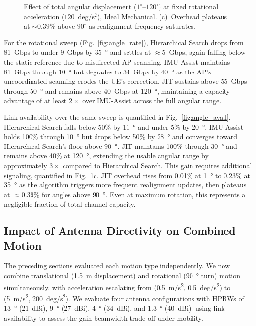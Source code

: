 \documentclass[fleqn,10pt]{wlscirep}
\begin{document}
\begin{figure}[ht!]
    \caption{Effect of total angular displacement ($1^\circ$--$120^\circ$) at fixed rotational acceleration ($120$~deg/s$^2$), Ideal Mechanical. (c)~Overhead plateaus at ${\sim}0.39\%$ above $90^\circ$ as realignment frequency saturates.}
    \label{fig:angle_effects}
    \vspace{-5pt}
\end{figure}

For the rotational sweep (Fig.~\ref{fig:angle_rate}), Hierarchical Search drops from \SI{81}{Gbps} to under \SI{9}{Gbps} by \SI{35}{\degree} and settles at $\approx$\SI{5}{Gbps}, again falling below the static reference due to misdirected AP scanning. IMU-Assist maintains \SI{81}{Gbps} through \SI{10}{\degree} but degrades to \SI{34}{Gbps} by \SI{40}{\degree} as the AP's uncoordinated scanning erodes the UE's correction. JIT sustains above \SI{55}{Gbps} through \SI{50}{\degree} and remains above \SI{40}{Gbps} at \SI{120}{\degree}, maintaining a capacity advantage of at least $2\times$ over IMU-Assist across the full angular range.

Link availability over the same sweep is quantified in Fig.~\ref{fig:angle_avail}. Hierarchical Search falls below 50\% by \SI{11}{\degree} and under 5\% by \SI{20}{\degree}. IMU-Assist holds 100\% through \SI{10}{\degree} but drops below 50\% by \SI{28}{\degree} and converges toward Hierarchical Search's floor above \SI{90}{\degree}. JIT maintains 100\% through \SI{30}{\degree} and remains above 40\% at \SI{120}{\degree}, extending the usable angular range by approximately $3\times$ compared to Hierarchical Search. This gain requires additional signaling, quantified in Fig.~\ref{fig:angle_effects}c. JIT overhead rises from 0.01\% at \SI{1}{\degree} to 0.23\% at \SI{35}{\degree} as the algorithm triggers more frequent realignment updates, then plateaus at $\approx$0.39\% for angles above \SI{90}{\degree}. Even at maximum rotation, this represents a negligible fraction of total channel capacity.



\subsection*{Impact of Antenna Directivity on Combined Motion}\label{sec:combined_motion}

The preceding sections evaluated each motion type independently. We now combine translational (\SI{1.5}{m} displacement) and rotational (\SI{90}{\degree} turn) motion simultaneously, with acceleration escalating from (\SI{0.5}{m/s^2}, \SI{0.5}{deg/s^2}) to (\SI{5}{m/s^2}, \SI{200}{deg/s^2}). We evaluate four antenna configurations with HPBWs of \SI{13}{\degree} (\SI{21}{dBi}), \SI{9}{\degree} (\SI{27}{dBi}), \SI{4}{\degree} (\SI{34}{dBi}), and \SI{1.3}{\degree} (\SI{40}{dBi}), using link availability to assess the gain-beamwidth trade-off under mobility.
\end{document}

